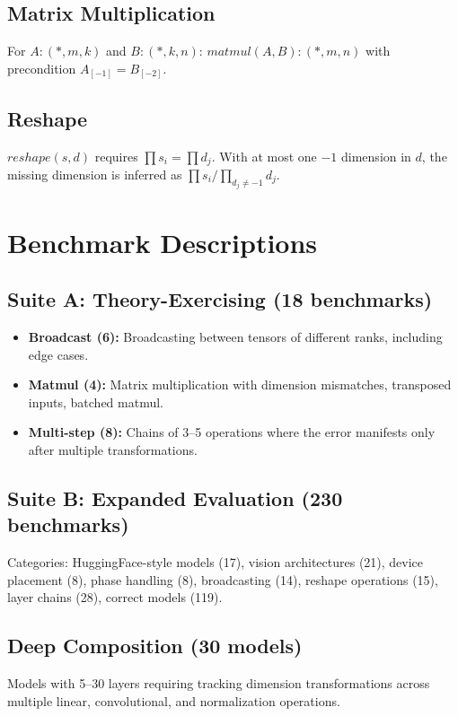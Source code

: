 \documentclass[11pt]{article}
\begin{document}
\subsection{Matrix Multiplication}
For $A : (*, m, k)$ and $B : (*, k, n)$:
$\mathit{matmul}(A, B) : (*, m, n)$ with precondition
$A_{[-1]} = B_{[-2]}$.

\subsection{Reshape}
$\mathit{reshape}(s, d)$ requires $\prod s_i = \prod d_j$.
With at most one $-1$ dimension in $d$, the missing dimension
is inferred as $\prod s_i / \prod_{d_j \neq -1} d_j$.


\section{Benchmark Descriptions}\label{app:benchmarks}

\subsection{Suite A: Theory-Exercising (18 benchmarks)}
\begin{itemize}[leftmargin=1.5em]
  \item \textbf{Broadcast (6):} Broadcasting between tensors of
    different ranks, including edge cases.
  \item \textbf{Matmul (4):} Matrix multiplication with dimension
    mismatches, transposed inputs, batched matmul.
  \item \textbf{Multi-step (8):} Chains of 3--5 operations where
    the error manifests only after multiple transformations.
\end{itemize}

\subsection{Suite B: Expanded Evaluation (230 benchmarks)}
Categories: HuggingFace-style models (17), vision architectures
(21), device placement (8), phase handling (8), broadcasting (14),
reshape operations (15), layer chains (28), correct models (119).

\subsection{Deep Composition (30 models)}
Models with 5--30 layers requiring tracking dimension transformations
across multiple linear, convolutional, and normalization operations.
\end{document}
